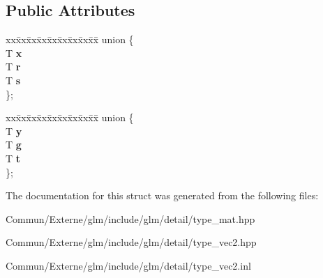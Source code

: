 \subsection*{Public Attributes}
\begin{DoxyCompactItemize}
\item 
\begin{tabbing}
xx\=xx\=xx\=xx\=xx\=xx\=xx\=xx\=xx\=\kill
union \{\\
\>T {\bfseries x}\\
\>T {\bfseries r}\\
\>T {\bfseries s}\\
\}; \hypertarget{structglm_1_1detail_1_1tvec2_afd7f3368f7e15406737f8fdcfa9a5ff3}{}\label{structglm_1_1detail_1_1tvec2_afd7f3368f7e15406737f8fdcfa9a5ff3}
\\

\end{tabbing}\item 
\begin{tabbing}
xx\=xx\=xx\=xx\=xx\=xx\=xx\=xx\=xx\=\kill
union \{\\
\>T {\bfseries y}\\
\>T {\bfseries g}\\
\>T {\bfseries t}\\
\}; \hypertarget{structglm_1_1detail_1_1tvec2_a21627d4405094fd892b5dbb0a672992c}{}\label{structglm_1_1detail_1_1tvec2_a21627d4405094fd892b5dbb0a672992c}
\\

\end{tabbing}\end{DoxyCompactItemize}


The documentation for this struct was generated from the following files\+:\begin{DoxyCompactItemize}
\item 
Commun/\+Externe/glm/include/glm/detail/type\+\_\+mat.\+hpp\item 
Commun/\+Externe/glm/include/glm/detail/type\+\_\+vec2.\+hpp\item 
Commun/\+Externe/glm/include/glm/detail/type\+\_\+vec2.\+inl\end{DoxyCompactItemize}
